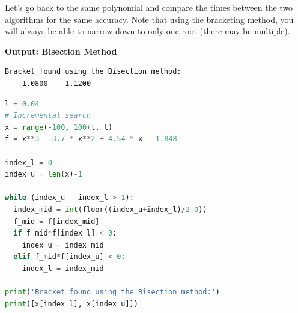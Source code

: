 \documentclass[book.tex]{subfiles}
\begin{document}
\begin{example} 
Let's go back to the same polynomial and compare the times between the two algorithms for the same accuracy. Note that using the bracketing method, you will always be able to narrow down to only one root (there may be multiple).
\begin{margintable}
\textbf{Output: Bisection Method}
\begin{verbatim}
Bracket found using the Bisection method:
    1.0800    1.1200
\end{verbatim}
\end{margintable}

\begin{lstlisting}[language=python]
l = 0.04
# Incremental search                                   
x = range(-100, 100+l, l)                              
f = x**3 - 3.7 * x**2 + 4.54 * x - 1.848               

index_l = 0
index_u = len(x)-1                                     

while (index_u - index_l > 1):                         
  index_mid = int(floor((index_u+index_l)/2.0))        
  f_mid = f[index_mid]
  if f_mid*f[index_l] < 0:
    index_u = index_mid                                
  elif f_mid*f[index_u] < 0:                           
    index_l = index_mid                                
  
print('Bracket found using the Bisection method:')     
print([x[index_l], x[index_u]])   
\end{lstlisting}
\end{example}
\end{document}
